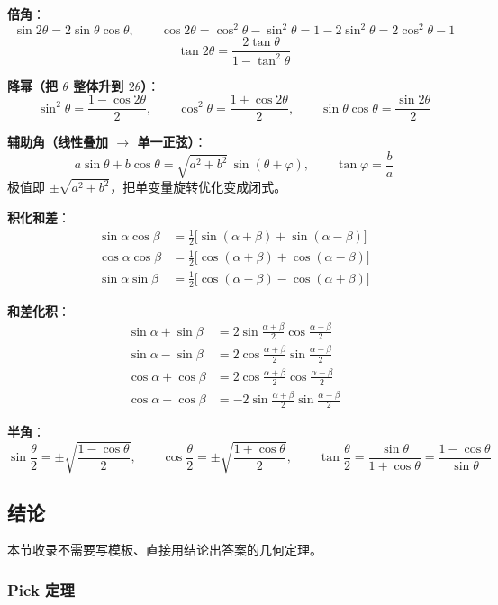 	\textbf{倍角}：
	$$
	\sin 2\theta = 2\sin\theta\cos\theta, \qquad
	\cos 2\theta = \cos^2\theta - \sin^2\theta = 1 - 2\sin^2\theta = 2\cos^2\theta - 1
	$$
	$$
	\tan 2\theta = \dfrac{2\tan\theta}{1 - \tan^2\theta}
	$$

	\textbf{降幂（把 $\theta$ 整体升到 $2\theta$）}：
	$$
	\sin^2\theta = \dfrac{1 - \cos 2\theta}{2}, \qquad
	\cos^2\theta = \dfrac{1 + \cos 2\theta}{2}, \qquad
	\sin\theta\cos\theta = \dfrac{\sin 2\theta}{2}
	$$

	\textbf{辅助角（线性叠加 $\to$ 单一正弦）}：
	$$
	a\sin\theta + b\cos\theta = \sqrt{a^2 + b^2}\,\sin(\theta + \varphi),
	\qquad \tan\varphi = \dfrac{b}{a}
	$$
	极值即 $\pm\sqrt{a^2 + b^2}$，把单变量旋转优化变成闭式。

	\textbf{积化和差}：
	\begin{align*}
		\sin\alpha\cos\beta & = \tfrac{1}{2}\bigl[\sin(\alpha+\beta) + \sin(\alpha-\beta)\bigr] \\
		\cos\alpha\cos\beta & = \tfrac{1}{2}\bigl[\cos(\alpha+\beta) + \cos(\alpha-\beta)\bigr] \\
		\sin\alpha\sin\beta & = \tfrac{1}{2}\bigl[\cos(\alpha-\beta) - \cos(\alpha+\beta)\bigr]
	\end{align*}

	\textbf{和差化积}：
	\begin{align*}
		\sin\alpha + \sin\beta & = 2\sin\tfrac{\alpha+\beta}{2}\cos\tfrac{\alpha-\beta}{2}  \\
		\sin\alpha - \sin\beta & = 2\cos\tfrac{\alpha+\beta}{2}\sin\tfrac{\alpha-\beta}{2}  \\
		\cos\alpha + \cos\beta & = 2\cos\tfrac{\alpha+\beta}{2}\cos\tfrac{\alpha-\beta}{2}  \\
		\cos\alpha - \cos\beta & = -2\sin\tfrac{\alpha+\beta}{2}\sin\tfrac{\alpha-\beta}{2}
	\end{align*}

	\textbf{半角}：
	$$
	\sin\dfrac{\theta}{2} = \pm\sqrt{\dfrac{1-\cos\theta}{2}}, \qquad
	\cos\dfrac{\theta}{2} = \pm\sqrt{\dfrac{1+\cos\theta}{2}}, \qquad
	\tan\dfrac{\theta}{2} = \dfrac{\sin\theta}{1+\cos\theta} = \dfrac{1-\cos\theta}{\sin\theta}
	$$

	\newpage

	\subsection{结论}

	本节收录不需要写模板、直接用结论出答案的几何定理。

	\subsubsection{Pick 定理}

